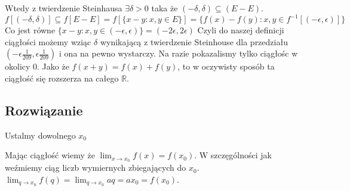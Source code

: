 \documentclass{article}
\begin{document}
Wtedy z twierdzenie Steinhausa $\exists \delta > 0$ taka że $(-\delta, \delta) \subseteq (E - E)$.
\[
 f[(-\delta, \delta)] \subseteq f[E - E] = f[ \{ x - y : x,y \in E  \}]  = \{ f(x) - f(y) : x,y \in f^{-1}[(-\epsilon, \epsilon)]  \}    
\]
Co jest równe $\{x-y : x,y \in (-\epsilon, \epsilon)\} = (-2\epsilon, 2\epsilon) $  Czyli do naszej definicji ciągłości możemy wziąc $\delta$ wynikającą z twierdzenie Steinhouse dla przedziału $(-\epsilon \frac{1}{209},\epsilon \frac{1}{209})$ i ona na pewno wystarczy. Na razie pokazalismy tylko ciągłośc w okolicy 0. Jako że $f(x+y) = f(x) + f(y)$, to w oczywisty sposób ta ciągłość się rozszerza na całego $\mathbb{R}$. 



\subsection*{Rozwiązanie}

Ustalmy dowolnego $x_0$

Mając ciągłość wiemy że $\lim_{x \to x_0} f(x) = f(x_0)$. W szczęgólności jak weźmiemy ciąg liczb wymiernych zbiegających do $x_0$. $\lim_{q \to x_0} f(q) = \lim_{q \to x_0} a q = a x_0 = f(x_0)$.
\end{document}
